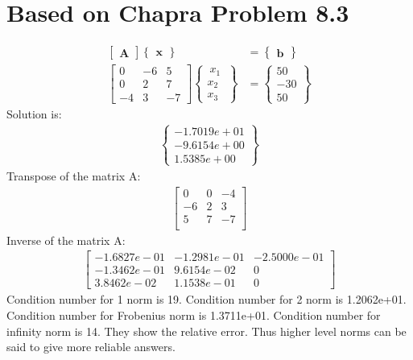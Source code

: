 \documentclass{article}
\begin{document}
\section{Based on Chapra Problem 8.3}
\begin {align*}
\begin {bmatrix}{\mathbf A }\end{bmatrix}
\begin {Bmatrix}{\mathbf x }\end{Bmatrix}&=
\begin {Bmatrix}{\mathbf b }\end{Bmatrix}\\
\begin {bmatrix}
0 & -6 & 5 \\
0 & 2 & 7 \\
-4 & 3 & -7
\end {bmatrix}
\begin {Bmatrix}
~ x_1 ~ \\ x_2 \\ x_3
\end {Bmatrix}&=
\begin {Bmatrix}
50 \\ -30 \\ 50
\end {Bmatrix}
\end {align*}
Solution is:
\begin{align*}
\begin{Bmatrix}
-1.7019e+01 \\ -9.6154e+00 \\ 1.5385e+00
\end{Bmatrix}
\end{align*}
Transpose of the matrix A:
\begin{align*}
\begin{bmatrix}
0 & 0 & -4 \\
-6 & 2 & 3 \\
5 & 7 & -7 \\
\end{bmatrix}
\end{align*}
Inverse of the matrix A:
\begin{align*}
\begin{bmatrix}
-1.6827e-01 & -1.2981e-01 & -2.5000e-01 \\
-1.3462e-01 & 9.6154e-02 & 0 \\
3.8462e-02 & 1.1538e-01 & 0
\end{bmatrix}
\end{align*}
Condition number for 1 norm is 19. Condition number for 2 norm is 1.2062e+01. Condition number for Frobenius norm is 1.3711e+01. Condition number for infinity norm is 14. They show the relative error. Thus higher level norms can be said to give more reliable answers. 
\end{document}
